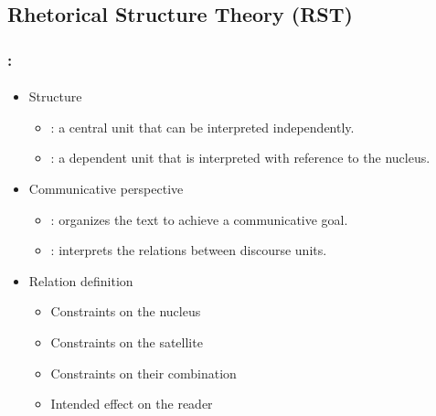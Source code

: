 \documentclass[xcolor=table]{beamer}
\begin{document}
\subsection{Rhetorical Structure Theory (RST)}

\begin{frame}
	\frametitle{\insertshortsubtitle: \insertsection}
	\framesubtitle{\insertsubsection}
	
	\begin{itemize}
		\item Structure  
		\begin{itemize}
			\item {}: a central unit that can be interpreted independently.
			\item {}: a dependent unit that is interpreted with reference to the nucleus.
		\end{itemize}
		
		\item Communicative perspective
		\begin{itemize}
			\item {}: organizes the text to achieve a communicative goal.
			\item {}: interprets the relations between discourse units.
		\end{itemize}
		
		\item Relation definition
		\begin{itemize}
			\item Constraints on the nucleus
			\item Constraints on the satellite 
			\item Constraints on their combination 
			\item Intended effect on the reader
		\end{itemize}
	\end{itemize}
	
\end{frame}
\end{document}
